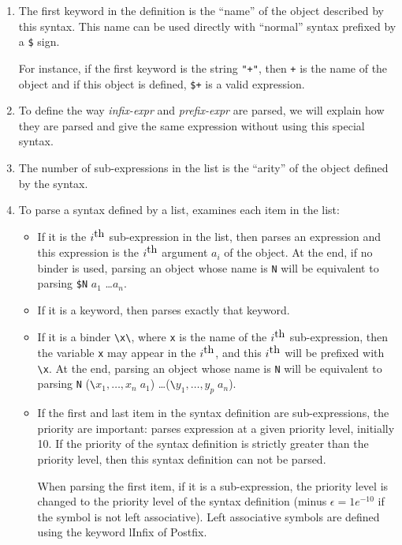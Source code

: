 \begin{enumerate}
\item The first keyword in the definition is the ``name'' of the
object described by this syntax. This name can be used directly with
``normal'' syntax prefixed by a \verb#$# sign. 

For instance, if the first keyword is the string \verb#"+"#, then
\verb#+# is the name of the object and if this object is defined,
\verb#$+# is a valid expression.

\item To define the way  {\it infix-expr} and {\it prefix-expr} are
parsed, we will explain how they are parsed and give the same
expression without using this special syntax.

\item The number of sub-expressions in the list is the ``arity'' of
the object defined by the syntax.

\item To parse a syntax defined by a list, \AFD{}  examines each item in
the list:
\begin{itemize}
\item If it is the $i^{\hbox{th}}$ sub-expression in the list, 
then \AFD{}  parses an expression and this expression is the $i^{\hbox{th}}$
argument $a_i$ of the object. At the end, if no binder is used,
parsing an object whose name is \verb#N# will be equivalent to parsing
\verb#$N# $a_1$ \dots $a_n$.
 
\item If it is a keyword, then \AFD{}  parses exactly that keyword.

\item If it is a binder \verb#\x\#, where \verb#x# is the name
of the $i^{\hbox{th}}$ sub-expression, then the variable \verb#x# may appear in
the $i^{\hbox{th}}$, and this $i^{\hbox{th}}$ will be prefixed with
\verb#\x#. At the end,
parsing an object whose name is \verb#N# will be equivalent to parsing
\verb#N# (\verb#\#$x_1,\dots,x_n\;a_1$) \dots (\verb#\#$y_1,\dots,y_p\;a_n$).

\item If the first and last item in the syntax definition are
sub-expressions, the priority are important: \AFD{}  parses expression at
a given priority level, initially 10. If the priority of the syntax
definition is strictly greater than the priority level, then this
syntax definition can not be parsed.

When parsing the first item, if it is a sub-expression, the
priority level is changed to the priority level of the syntax
definition (minus $\epsilon = 1e^{-10}$ if the symbol is not left
associative). Left associative symbols are defined using the keyword
lInfix of Postfix.


\end{itemize}
\end{enumerate}
